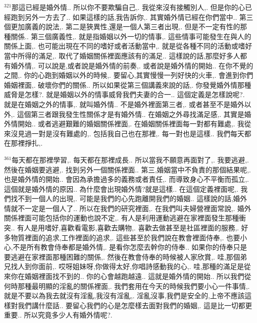 \documentclass{book}
\begin{document}
$^{321}$那這已經是婚外情..
所以你不要欺騙自己,.
我從來沒有接觸別人,.
但是你的心已經跑到另外一方去了..
如果這樣的話,我告訴你,.
其實婚外情已經在你們當中..
第三個更加廣義的說法,.
第二是狹異性,還是一個人第三者出現,.
但是不一定有性的那種關係..
第三個廣義性,.
就是指婚姻以外一切的情事,.
這些情事可能發生在與人的關係上面,.
也可能出現在不同的嗜好或者活動當中,.
就是從各種不同的活動或嗜好當中所得的滿足,.
取代了婚姻關係裡面應該有的滿足..
這樣說的話,那麼好多人都有婚外情,.
可以說是,或者說是婚外情的前奏,.
或者說是婚外情的開始..
在你不覺的之間,.
你的心跑到婚姻以外的時候,.
要留心,其實慢慢一列好快的火車,.
會進到你們婚姻裡面,.
破壞你們的關係..
所以如果從第三個講義來說的話,.
你發覺婚外情那種威脅是怎樣?.
就是婚姻以外的情事威脅我們夫妻的合一..
這個定義是怎樣說呢?.
就是在婚姻之外的情事,.
就叫婚外情..
不是婚外裡面第三者,.
或者甚至不是婚外以外,.
這個第三者跟我發生性關係才是有婚外情..
在婚姻之外尋找滿足感,.
其實是婚外情開始..
或者逃避艱難的婚姻關係裡面,.
在婚姻關係裡面每一對都有難處,.
我從來沒見過一對是沒有難處的,.
包括我自己也在那裡,.
每一對也是這樣..
我們每天都在那裡掙扎,.

$^{361}$每天都在那裡學習,.
每天都在那裡成長..
所以當我不願意再面對了,.
我要逃避,.
然後在婚姻要逃避,.
找到另外一個關係裡面..
第三,婚姻當中不負責的那個結果呢,.
也是婚外情的開始..
會因為承擔過多的義務或者責任,.
而導致身心不平衡而孤立,.
這個就是婚外情的原因..
為什麼會出現婚外情?就是這樣..
在這個定義裡面呢,.
我們找不到一個人的出現,.
可能是我們的心先跑離開我們的婚姻..
這樣說的話,婚外情就不一定是一個人了..
所以在我們的研究裡面,.
在我們叫夫婦營裡面常說,.
婚外關係裡面可能包括你的運動也說不定,.
有人是利用運動逃避在家裡面發生那種衝突..
有人是用嗜好,喜歡看電影,喜歡去購物,.
喜歡去做甚至是社區裡面的服務,.
好多物質裡面的追求,工作裡面的追求,.
這些甚至於我們說在教會裡面侍奉,.
也要小心,不是所有教會侍奉都是婚外情,.
是看你怎麼去幹你的侍奉..
如果你的侍奉只是要逃避在家裡面那種困難的關係,.
然後在教會侍奉的時候被人家欣賞,.
哇,那個弟兄找人到你面前,.
哎呀姐妹呀,你做得太好,你唱詩感動我的心,.
哇,那種的滿足是從來你在婚姻裡面找不到的..
你的心會越跑越遠..
這就是婚外情的開始..
所以我們從何時那種最明顯的淫亂的關係裡面,.
我們套用在今天的時候我們要小心一件事情,.
就是不要以為我去就沒有淫亂,我沒有淫亂,.
淫亂沒事,我們是安全的,上帝不應該這樣對我們講什麼話..
要留心我們的心是怎麼樣去面對我們的婚姻,.
這是比一切都更重要..
所以究竟多少人有婚外情呢?.
\end{document}
